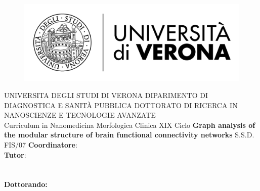 
\begin{titlepage}
    \begin{figure}[!h]
    \flushleft
	\includegraphics[width=0.25\columnwidth]{images/univr.png}
	\end{figure}

    \begin{center}
    	\large
        UNIVERSITA DEGLI STUDI DI VERONA
        \hfill
        \vfill
		DIPARIMENTO DI DIAGNOSTICA E SANIT\`A PUBBLICA
		\vfill
		DOTTORATO DI RICERCA IN NANOSCIENZE E TECNOLOGIE AVANZATE\\Curriculum in Nanomedicina Morfologica Clinica
		\vfill
		XIX Ciclo
		\vfill
        \begingroup
       		\huge\textbf{
            Graph analysis of the modular structure of brain functional connectivity networks
            }
            \bigskip
        \endgroup
        \vfill
        S.S.D. FIS/07
		\flushleft 
		\normalsize{\textbf{Coordinatore}:}\\
		\flushleft
		\normalsize{\textbf{Tutor}:}\\
		\\
		\\
        \vfill  
        \flushright
        \normalsize{\textbf{Dottorando:}}\\
        \\	
		\vfill

    \end{center}  
\end{titlepage}

